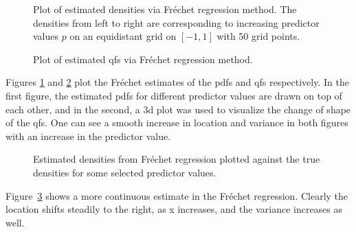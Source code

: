 \begin{figure}[h!]
    \centering
    \resizebox{1\textwidth}{!}{}
    \caption[Estimated pdfs from Fréchet method]{Plot of estimated densities via Fréchet regression method.
    The densities from left to right are corresponding to increasing predictor values $p$ on an
    equidistant grid on $[-1,1]$ with 50 grid points.}
    \label{fig:frechet_estimates}
\end{figure}

\begin{figure}[h!]
    \centering
    \resizebox{1\textwidth}{!}{}
    \caption[Estimated qfs from Fréchet method]{Plot of estimated qfs via Fréchet regression method.}
    \label{fig:frechet_estimates_3d}
\end{figure}

Figures \ref{fig:frechet_estimates} and \ref{fig:frechet_estimates_3d} plot the Fréchet
estimates of the pdfs and qfs respectively. In the first figure, the estimated pdfs for
different predictor values are drawn on top of each other, and in the second, a 3d plot
was used to visualize the change of shape of the qfs. One can see a smooth
increase in location and variance in both figures with an increase in the predictor
value.


\begin{figure}[h!]
    \centering
    \resizebox{1\textwidth}{!}{}
    \caption[Comparison: estimated vs. true densities --- Fréchet]{Estimated
    densities from Fréchet regression plotted against the true densities for some selected
    predictor values.}
    \label{fig:frechet_est_vs_true}
\end{figure}
Figure~\ref{fig:frechet_est_vs_true} shows a more continuous estimate in the Fréchet
regression. Clearly the location shifts steadily to the right, as x increases, and the
variance increases as well.

